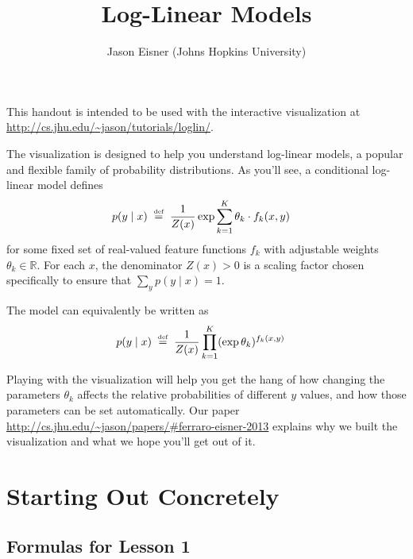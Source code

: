 \documentclass[11pt]{article}
\newcommand{\defeq}{\;\stackrel{\mbox{\tiny def}}{=}\;}
\newcommand{\Real}{{\mathbb R}}
\begin{document}
\title{\vspace{-2.3cm}Log-Linear Models}
\author{Jason Eisner (Johns Hopkins University)}
\date{}
\maketitle

\tcolorbox
\begin{small}
\begin{center}
This handout is intended to be used with the
    interactive visualization at
\url{http://cs.jhu.edu/~jason/tutorials/loglin/}.
\end{center}

The visualization is designed to help you understand log-linear
models, a popular and flexible family of probability distributions.
As you'll see, a conditional log-linear model defines
\begin{align*}
  p(y \mid x) & \defeq \frac{1}{Z(x)} \exp \sum_{k=1}^K \theta_k \cdot
                f_k(x,y)
\end{align*}
for some fixed set of real-valued feature functions $f_k$ with adjustable
weights $\theta_k \in \Real$.  For each $x$, the denominator $Z(x) >
0$ is a scaling factor chosen specifically
to ensure that $\sum_y p(y \mid x) = 1$.

\medskip
The model can equivalently be written as
\begin{align*}
p(y \mid x) & \defeq \frac{1}{Z(x)} \prod_{k=1}^K (\exp \theta_k)^{f_k(x,y)}
\end{align*}

\medskip
Playing with the visualization will help you get the hang of
how changing the parameters $\theta_k$ affects the relative
probabilities of different $y$ values, and how those parameters can be
set automatically.  Our paper
\url{http://cs.jhu.edu/~jason/papers/#ferraro-eisner-2013} explains
why we built the visualization and what we hope you'll get out of it.
\end{small}
\endtcolorbox

\section{Starting Out Concretely}\label{sec:concrete}

\subsection{Formulas for Lesson 1}
\end{document}

